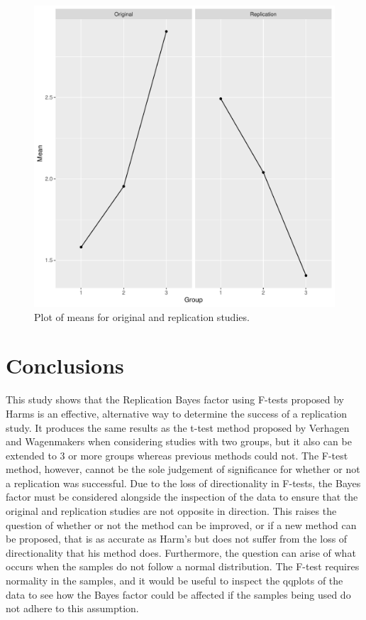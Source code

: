 \documentclass[11pt]{article}
\begin{document}
\begin{figure}[H]
    \centering
        \includegraphics[scale=.7]{figures/Group_9_Figure_3.pdf}
    \caption{Plot of means for original and replication studies.}
    \label{fig:3}
\end{figure}
\section{Conclusions}

This study shows that the Replication Bayes factor using F-tests proposed by Harms is an effective, alternative way to determine the success of a replication study. It produces the same results as the t-test method proposed by Verhagen and Wagenmakers when considering studies with two groups, but it also can be extended to 3 or more groups whereas previous methods could not. The F-test method, however, cannot be the sole judgement of significance for whether or not a replication was successful. Due to the loss of directionality in F-tests, the Bayes factor must be considered alongside the inspection of the data to ensure that the original and replication studies are not opposite in direction. This raises the question of whether or not the method can be improved, or if a new method can be proposed, that is as accurate as Harm’s but does not suffer from the loss of directionality that his method does. Furthermore, the question can arise of what occurs when the samples do not follow a normal distribution. The F-test requires normality in the samples, and it would be useful to inspect the qqplots of the data to see how the Bayes factor could be affected if the samples being used do not adhere to this assumption. 
\end{document}
